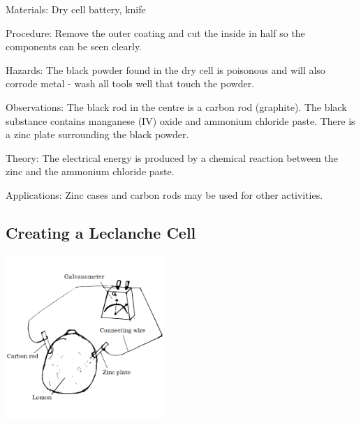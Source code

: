 \begin{multicols}{2}
\begin{description*}
\item[Materials:]{Dry cell battery, knife}
\item[Procedure:]{Remove the outer coating and cut the inside in half so the components can be seen clearly.}
\item[Hazards:]{The black powder found in the dry cell is poisonous and will also corrode metal - wash all tools well that touch the powder.}
\item[Observations:]{The black rod in the centre is a carbon rod (graphite). The black substance contains manganese (IV) oxide and ammonium chloride paste. There is a zinc plate surrounding the black powder.}
\item[Theory:]{The electrical energy is produced by a chemical reaction between the zinc and the ammonium chloride paste.}
\item[Applications:]{Zinc cases and carbon rods may be used for other activities.}
\end{description*}

\vfill
\columnbreak

\subsection{Creating a Leclanche Cell} 

\begin{center}
\includegraphics[width=0.45\textwidth]{./img/lechlanche-cell.png}
\end{center}


\end{multicols}
